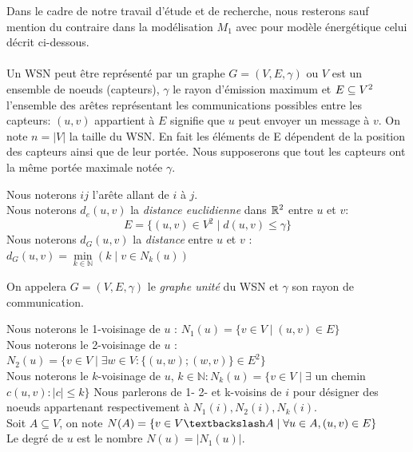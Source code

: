   Dans le cadre de notre travail d'étude et de recherche, nous resterons sauf mention du contraire dans la modélisation $M_1$ avec pour modèle énergétique celui décrit ci-dessous.\\
  \paragraph*{} Un WSN peut être représenté par un graphe $G= (V,E,\gamma)$ ou $V$ est un ensemble de noeuds (capteurs), $\gamma$ le rayon d'émission maximum et $E \subseteq V \textsuperscript{2}$ l'ensemble des arêtes représentant les communications possibles entre les capteurs: $(u,v)$ appartient à $E$ signifie que $u$ peut envoyer un  message à $v$. On note $ n=|V| $ la taille du WSN. En fait les éléments de E dépendent de la
 position des capteurs ainsi que de leur portée. Nous supposerons que tout les capteurs ont la même portée maximale notée $\gamma$. 


\begin{mydef}
Nous noterons $ij$ l'arête allant de $i$ à $j$. \\
Nous noterons $d_e(u,v)$ la \textit{distance euclidienne} dans $\mathbb{R} \textsuperscript{2}$ entre $u$ et $v$:
$$E = \{ (u,v) \in V ^{2} \mid d(u,v) \leq \gamma \}$$
Nous noterons $d_G(u,v)$ la \textit{distance} entre $ u $ et $ v $ : $d_G(u,v)= \min\limits_{k \in \mathbb{N}}(k \mid v \in N_k(u))$
\end{mydef}


\begin{mydef}
 On appelera $G= (V,E,\gamma)$ le \textit{graphe unité} du WSN et $\gamma$ son rayon de communication.
\end{mydef}



\begin{mydef}
Nous noterons le 1-voisinage de $u$ : $N_1(u) = \{ v \in V  \mid (u,v) \in E \}$ \\
Nous noterons le 2-voisinage de $u$ : $N_2(u) = \{ v \in V \mid  \exists w \in V :\{(u,w);(w,v)\} \in E ^2\}$ \\
Nous noterons le $k$-voisinage de $u$, $k \in \mathbb{N} : N_k(u) = \{ v \in V  \mid \exists $ un chemin $c (u,v): |c| \leq k\}$  Nous parlerons de 1- 2- et k-voisins de $i$ pour désigner des noeuds appartenant respectivement
 à $N_1(i), N_2(i),N_k(i)$. \\
Soit $A \subseteq V$, on note $N(A) = \{ v \in V\textbackslash  A \mid \forall u\in A,(u,v) \in E \}$ \\
Le degré de $ u $ est le nombre  $N(u)=|N_1(u)|$.\\
\end{mydef}

